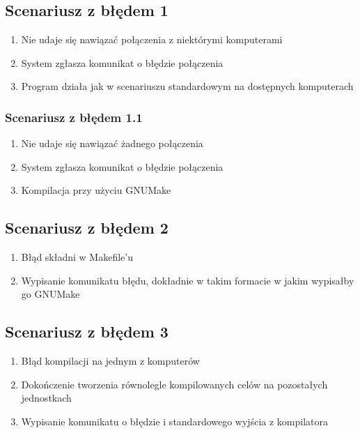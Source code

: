 \documentclass[a4paper]{article}
\begin{document}
\subsection{Scenariusz z błędem 1}

\begin{enumerate}
	\item Nie udaje się nawiązać połączenia z niektórymi komputerami
	\item System zgłasza komunikat o błędzie połączenia
	\item Program działa jak w scenariuszu standardowym na dostępnych komputerach
\end{enumerate}


\subsubsection{Scenariusz z błędem 1.1}

\begin{enumerate}
	\item Nie udaje się nawiązać żadnego połączenia
	\item System zgłasza komunikat o błędzie połączenia
	\item Kompilacja przy użyciu GNUMake
\end{enumerate}


\subsection{Scenariusz z błędem 2}

\begin{enumerate}
	\item Błąd składni w Makefile’u
	\item Wypisanie komunikatu błędu, dokładnie w takim formacie w jakim wypisałby go GNUMake
\end{enumerate}


\subsection{Scenariusz z błędem 3}

\begin{enumerate}
	\item Błąd kompilacji na jednym z komputerów
	\item Dokończenie tworzenia równolegle kompilowanych celów na pozostałych jednostkach
	\item Wypisanie komunikatu o błędzie i standardowego wyjścia z kompilatora
\end{enumerate}
\end{document}
